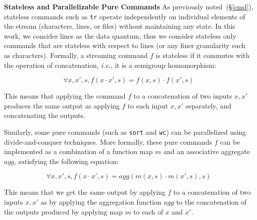 \documentclass[sigplan, review, screen, anonymous]{acmart}
\newcommand{\ie}{{\em i.e.}, }
\newcommand{\heading}[1]{\vspace{4pt}\noindent\textbf{#1}\enspace}
\newcommand{\ttt}[1]{\texttt{#1}}
\newcommand{\kk}[1]{[{\color{magenta}kk: #1}]}
\newcommand{\km}[1]{[{\color{blue}km: #1}]}
\newcommand{\sx}[1]{(\S\ref{#1})}
\begin{document}
\heading{Stateless and Parallelizable Pure Commands}
As previously noted~\sx{cmd}, stateless commands such as \ttt{tr}
operate independently on individual elements of the stream
(characters, lines, or files) without maintaining any state. In this
work, we consider lines as the data quantum, thus we consider stateless only commands that are
stateless with respect to lines (or any finer granularity such as
characters). Formally, a streaming command $f$ is stateless if it commutes with
the operation of concatenation, \ie it is a semigroup homomorphism:

\[
\forall x, x', s, f(x \cdot x', s) = f(x, s) \cdot f(x', s)
\]


\noindent
This means that applying the command $f$ to a concatenation of two
inputs $x, x'$ produces the same output as applying $f$ to each input
$x, x'$ separately, and concatenating the outputs.

Similarly, some pure commands (such as \ttt{sort} and \ttt{wc}) can be
parallelized using divide-and-conquer techniques. More formally, these
pure commands $f$ can be implemented as a combination of a function map
$m$ and an associative aggregate $agg$, satisfying the following equation:

\[
\forall x, x', s, f(x \cdot x', s) = agg(m(x, s) \cdot m(x', s), s)
\]

\noindent
This means that we get the same output by applying $f$ to a
concatenation of two inputs $x, x'$ as by applying the aggregation function
$agg$ to the concatenation of the outputs produced by applying map $m$
to each of $x$ and $x'$.
\end{document}
